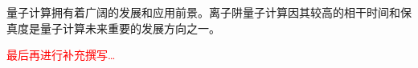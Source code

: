 
\begin{conclusion}

量子计算拥有着广阔的发展和应用前景。离子阱量子计算因其较高的相干时间和保真度是量子计算未来重要的发展方向之一。

\textcolor{red}{最后再进行补充撰写\dots}
\end{conclusion}


